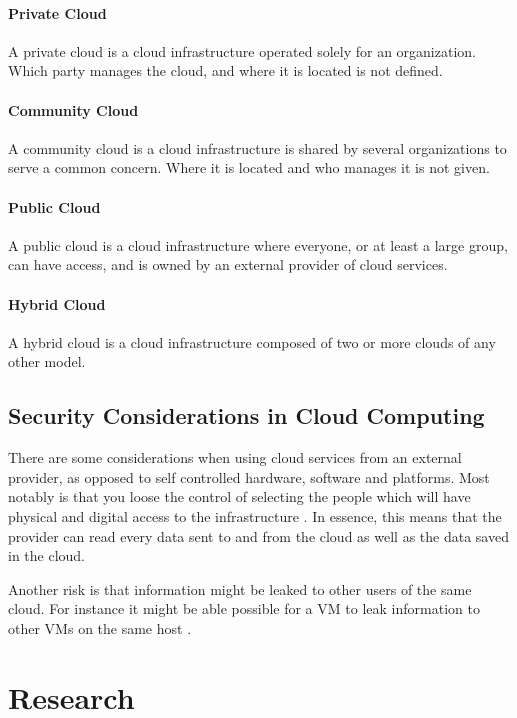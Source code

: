 \documentclass[pdftex,english,10pt,b5paper,twoside]{book}
\begin{document}
\paragraph{Private Cloud} A private cloud is a cloud infrastructure operated
solely for an organization. Which party manages the cloud, and where it is
located is not defined.

\paragraph{Community Cloud} A community cloud is a cloud infrastructure is
shared by several organizations to serve a common concern. Where it is located
and who manages it is not given.

\paragraph{Public Cloud} A public cloud is a cloud infrastructure where
everyone, or at least a large group, can have access, and is owned by an external
provider of cloud services.

\paragraph{Hybrid Cloud} A hybrid cloud is a cloud infrastructure composed of
two or more clouds of any other model.

\subsection{Security Considerations in Cloud Computing}

There are some considerations when using cloud services from an external
provider, as opposed to self controlled hardware, software and platforms. Most
notably is that you loose the control of selecting the people which will have
physical and digital access to the infrastructure \cite{cloud_getoff}. In
essence, this means that the provider can read every data sent to and from the
cloud as well as the data saved in the cloud.

Another risk is that information might be leaked to other users of the same
cloud. For instance it might be able possible for a \ac{VM} to leak information
to other \acp{VM} on the same host \cite{cloud_getoff}.

\section{Research}
\label{sec:research}
\end{document}
